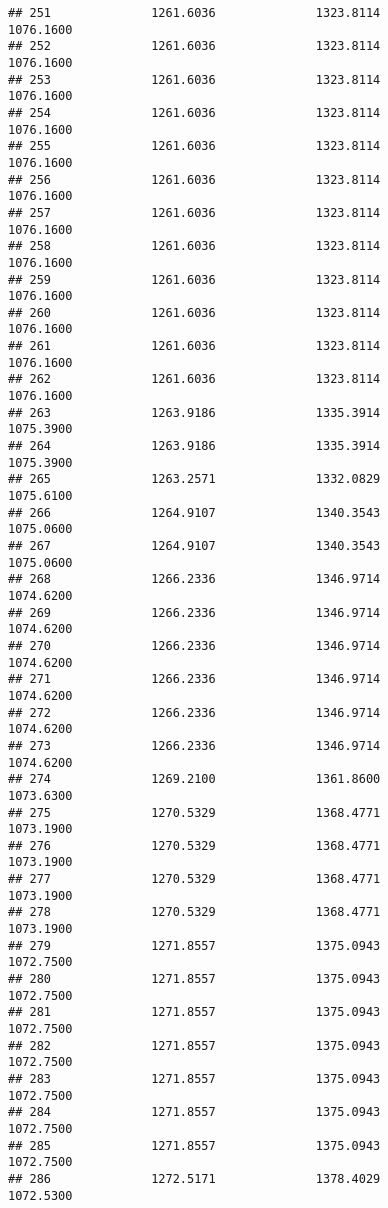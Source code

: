 \documentclass[]{article}
\begin{document}
\begin{verbatim}
## 251              1261.6036              1323.8114           1076.1600
## 252              1261.6036              1323.8114           1076.1600
## 253              1261.6036              1323.8114           1076.1600
## 254              1261.6036              1323.8114           1076.1600
## 255              1261.6036              1323.8114           1076.1600
## 256              1261.6036              1323.8114           1076.1600
## 257              1261.6036              1323.8114           1076.1600
## 258              1261.6036              1323.8114           1076.1600
## 259              1261.6036              1323.8114           1076.1600
## 260              1261.6036              1323.8114           1076.1600
## 261              1261.6036              1323.8114           1076.1600
## 262              1261.6036              1323.8114           1076.1600
## 263              1263.9186              1335.3914           1075.3900
## 264              1263.9186              1335.3914           1075.3900
## 265              1263.2571              1332.0829           1075.6100
## 266              1264.9107              1340.3543           1075.0600
## 267              1264.9107              1340.3543           1075.0600
## 268              1266.2336              1346.9714           1074.6200
## 269              1266.2336              1346.9714           1074.6200
## 270              1266.2336              1346.9714           1074.6200
## 271              1266.2336              1346.9714           1074.6200
## 272              1266.2336              1346.9714           1074.6200
## 273              1266.2336              1346.9714           1074.6200
## 274              1269.2100              1361.8600           1073.6300
## 275              1270.5329              1368.4771           1073.1900
## 276              1270.5329              1368.4771           1073.1900
## 277              1270.5329              1368.4771           1073.1900
## 278              1270.5329              1368.4771           1073.1900
## 279              1271.8557              1375.0943           1072.7500
## 280              1271.8557              1375.0943           1072.7500
## 281              1271.8557              1375.0943           1072.7500
## 282              1271.8557              1375.0943           1072.7500
## 283              1271.8557              1375.0943           1072.7500
## 284              1271.8557              1375.0943           1072.7500
## 285              1271.8557              1375.0943           1072.7500
## 286              1272.5171              1378.4029           1072.5300

\end{verbatim}
\end{document}
